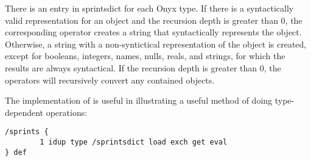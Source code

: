 There is an entry in sprintsdict for each Onyx type.  If there is a
syntactically valid representation for an object and the recursion depth is
greater than 0, the corresponding operator creates a string that syntactically
represents the object.  Otherwise, a string with a non-syntictical
representation of the object is created, except for booleans, integers, names,
nulls, reals, and strings, for which the results are always syntactical.  If the
recursion depth is greater than 0, the operators will recursively convert any
contained objects.

The implementation of  is
useful in illustrating a useful method of doing type-dependent operations:

\begin{verbatim}
/sprints {
        1 idup type /sprintsdict load exch get eval
} def
\end{verbatim}


